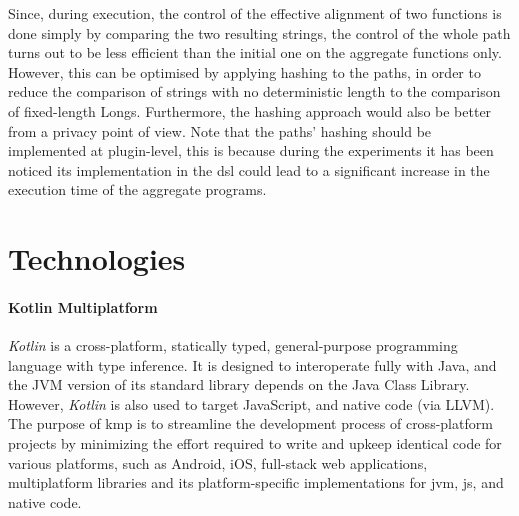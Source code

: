 Since, during execution, the control of the effective alignment of two functions is done simply by comparing the two resulting strings,
the control of the whole path turns out to be less efficient than the initial one on the aggregate functions only.
However, this can be optimised by applying hashing to the paths, in order to reduce the comparison of strings with no deterministic length
to the comparison of fixed-length Longs.
Furthermore, the hashing approach would also be better from a privacy point of view.
Note that the paths' hashing should be implemented at plugin-level, this is because during the experiments it has been noticed
its implementation in the \ac{dsl} could lead to a significant increase in the execution time of the aggregate programs.


\section{Technologies}
\label{sec:technologies}

\paragraph{Kotlin Multiplatform}
\label{par:kotlin-multiplatform}

\emph{Kotlin} is a cross-platform, statically typed, general-purpose programming language with type inference.
It is designed to interoperate fully with Java, and the JVM version of its standard library depends on the Java Class Library.
However, \emph{Kotlin} is also used to target JavaScript, and native code (via LLVM).
The purpose of \ac{kmp} is to streamline the development process of cross-platform projects by minimizing
the effort required to write and upkeep identical code for various platforms, such as Android, iOS, full-stack web applications,
multiplatform libraries and its platform-specific implementations for \ac{jvm}, \ac{js}, and native code.

